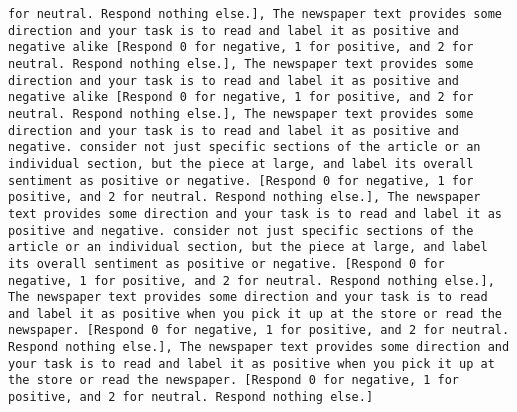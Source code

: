 \begin{lstlisting}[label=lst:poor_performing_prompts]
for neutral. Respond nothing else.], The newspaper text provides some direction and your task is to read and label it as positive and negative alike [Respond 0 for negative, 1 for positive, and 2 for neutral. Respond nothing else.], The newspaper text provides some direction and your task is to read and label it as positive and negative alike [Respond 0 for negative, 1 for positive, and 2 for neutral. Respond nothing else.], The newspaper text provides some direction and your task is to read and label it as positive and negative. consider not just specific sections of the article or an individual section, but the piece at large, and label its overall sentiment as positive or negative. [Respond 0 for negative, 1 for positive, and 2 for neutral. Respond nothing else.], The newspaper text provides some direction and your task is to read and label it as positive and negative. consider not just specific sections of the article or an individual section, but the piece at large, and label its overall sentiment as positive or negative. [Respond 0 for negative, 1 for positive, and 2 for neutral. Respond nothing else.], The newspaper text provides some direction and your task is to read and label it as positive when you pick it up at the store or read the newspaper. [Respond 0 for negative, 1 for positive, and 2 for neutral. Respond nothing else.], The newspaper text provides some direction and your task is to read and label it as positive when you pick it up at the store or read the newspaper. [Respond 0 for negative, 1 for positive, and 2 for neutral. Respond nothing else.]

\end{lstlisting}
